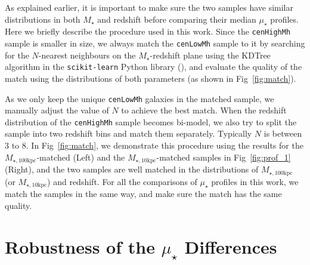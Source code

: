 \documentclass[a4paper,fleqn,usenatbib]{mnras}
\def\rbcg{\texttt{cenHighMh}}
\def\nbcg{\texttt{cenLowMh}}
\def\mstar{{$M_{\star}$}}
\def\minn{{$M_{\star,10\mathrm{kpc}}$}}
\def\mtot{{$M_{\star,100\mathrm{kpc}}$}}
\def\mden{{$\mu_{\star}$}}
\begin{document}
    As explained earlier, it is important to make sure the two samples have similar 
    distributions in both \mstar{} and redshift before comparing their median \mden{} 
    profiles.  
    Here we briefly describe the procedure used in this work. 
    Since the \rbcg{} sample is smaller in size, we always match the \nbcg{} sample to 
    it by searching for the $N$-nearest neighbours on the $M_{\star}$-redshift plane 
    using the KDTree algorithm in the \texttt{scikit-learn} Python library 
    (\citealt{scikit-learn}), and evaluate the quality of the match using the 
    distributions of both parameters (as shown in Fig~\ref{fig:match}). 
 
    As we only keep the unique \nbcg{} galaxies in the matched sample, we manually 
    adjust the value of $N$ to achieve the best match. 
    When the redshift distribution of the \rbcg{} sample becomes bi-model, we also try 
    to split the sample into two redshift bins and match them separately. 
    Typically $N$ is between 3 to 8.
    In Fig~\ref{fig:match}, we demonstrate this procedure using the results for 
    the \mtot{}-matched (Left) and the \minn{}-matched samples in Fig~\ref{fig:prof_1}
    (Right), and the two samples are well matched in the distributions of \mtot{}
    (or \minn{}) and redshift.  
    For all the comparisons of \mden{} profiles in this work, we match the samples 
    in the same way, and make sure the match has the same quality. 

    
\section{Robustness of the \mden{} Differences} 
	\label{app:robust}
\end{document}

